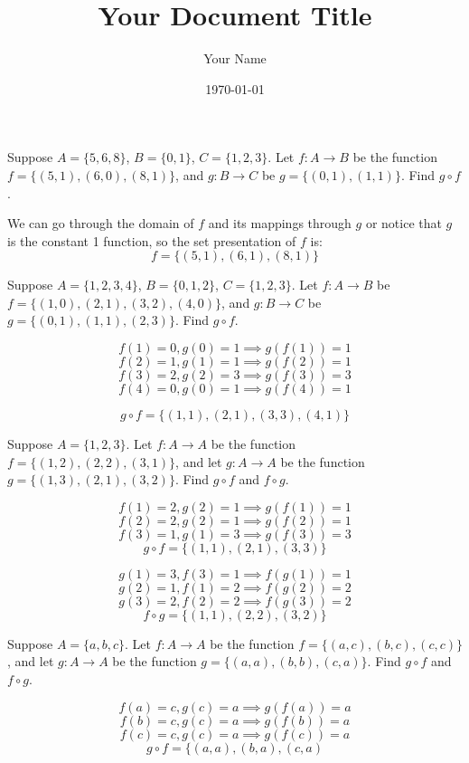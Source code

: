 \documentclass{article}
\title{Your Document Title}
\author{Your Name}
\date{\today} %
\begin{document}
\maketitle

\begin{problem}
Suppose $A = \{5, 6, 8\}$, $B = \{0, 1\}$, $C = \{1, 2, 3\}$. Let $f : A \to B$ be the function $f = \{(5, 1), (6, 0), (8, 1)\}$, and $g : B \to C$ be $g = \{(0, 1), (1, 1)\}$. Find $g \circ f$.
\end{problem}

We can go through the domain of $f$ and its mappings through $g$ or notice that $g$ is the constant 1 function, so the set presentation of $f$ is:
$$f = \{(5, 1), (6, 1), (8, 1)\}$$

\begin{problem}
Suppose $A = \{1, 2, 3, 4\}$, $B = \{0, 1, 2\}$, $C = \{1, 2, 3\}$. Let $f : A \to B$ be $f = \{(1, 0), (2, 1), (3, 2), (4, 0)\}$, and $g : B \to C$ be $g = \{(0, 1), (1, 1), (2, 3)\}$. Find $g \circ f$.
\end{problem}

$$f(1) = 0, g(0) = 1 \implies g(f(1)) = 1$$
$$f(2) = 1, g(1) = 1 \implies g(f(2)) = 1$$
$$f(3) = 2, g(2) = 3 \implies g(f(3)) = 3$$
$$f(4) = 0, g(0) = 1 \implies g(f(4)) = 1$$

$$g\circ f = \{(1, 1), (2, 1), (3, 3), (4, 1)\}$$

\begin{problem}
Suppose $A = \{1, 2, 3\}$. Let $f : A \to A$ be the function $f = \{(1, 2), (2, 2), (3, 1)\}$, and let $g : A \to A$ be the function $g = \{(1, 3), (2, 1), (3, 2)\}$. Find $g \circ f$ and $f \circ g$.
\end{problem}

$$f(1) = 2, g(2) = 1 \implies g(f(1)) =1$$
$$f(2) = 2, g(2) = 1 \implies g(f(2)) = 1$$
$$f(3) = 1, g(1) = 3 \implies g(f(3)) = 3$$
$$g\circ f = \{(1, 1), (2, 1), (3, 3)\}$$

$$g(1) = 3, f(3) = 1 \implies f(g(1)) = 1$$
$$g(2) = 1, f(1) = 2 \implies f(g(2)) = 2$$
$$g(3) = 2, f(2) = 2 \implies f(g(3)) = 2$$
$$f\circ g = \{(1, 1), (2, 2), (3, 2)\}$$

\begin{problem}
Suppose $A = \{a, b, c\}$. Let $f : A \to A$ be the function $f = \{(a, c), (b, c), (c, c)\}$, and let $g : A \to A$ be the function $g = \{(a, a), (b, b), (c, a)\}$. Find $g \circ f$ and $f \circ g$.
\end{problem}

$$f(a) = c, g(c) = a \implies g(f(a)) = a$$
$$f(b) = c, g(c) = a \implies g(f(b)) = a$$
$$f(c) = c, g(c) = a \implies g(f(c)) = a$$
$$g \circ f = \{(a, a), (b, a), (c, a)$$
\end{document}
